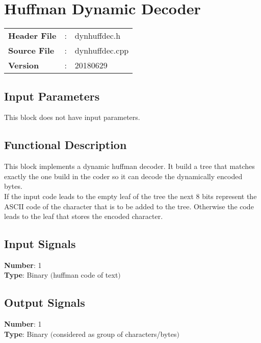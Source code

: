 \clearpage

\section{Huffman Dynamic Decoder}

\begin{tcolorbox}	
\begin{tabular}{p{2.75cm} p{0.2cm} p{10.5cm}} 	
\textbf{Header File}   &:& dynhuffdec.h \\
\textbf{Source File}   &:& dynhuffdec.cpp \\
\textbf{Version}       &:& 20180629
\end{tabular}
\end{tcolorbox}

\subsection*{Input Parameters}

This block does not have input parameters.

\subsection*{Functional Description}

This block implements a dynamic huffman decoder. It build a tree that matches exactly the one build in the coder so it can decode the dynamically encoded bytes.\\
If the input code leads to the empty leaf of the tree the next 8 bits represent the ASCII code of the character that is to be added to the tree. Otherwise the code leads to the leaf that stores the encoded character.

\subsection*{Input Signals}

\textbf{Number}: 1\\
\textbf{Type}: Binary $($huffman code of text$)$

\subsection*{Output Signals}

\textbf{Number}: 1\\
\textbf{Type}: Binary $($considered as group of characters/bytes$)$

%